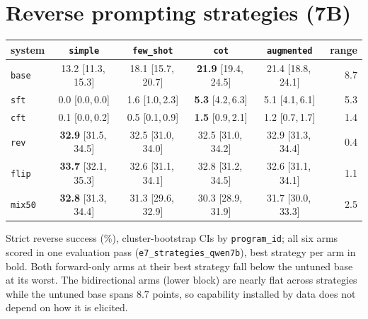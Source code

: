 \documentclass{article}
\newcommand{\arm}[1]{\texttt{#1}}
\newcommand{\ci}[2]{{\small[#1,\,#2]}}
\begin{document}
\section{Reverse prompting strategies (7B)}
\label{app:e7}
\begin{center}\small
\begin{tabular}{lccccr}
\toprule
system & \texttt{simple} & \texttt{few\_shot} & \texttt{cot} & \texttt{augmented} & range \\
\midrule
\arm{base} & 13.2 \ci{11.3}{15.3} & 18.1 \ci{15.7}{20.7} & \textbf{21.9} \ci{19.4}{24.5} & 21.4 \ci{18.8}{24.1} & 8.7 \\
\arm{sft} & 0.0 \ci{0.0}{0.0} & 1.6 \ci{1.0}{2.3} & \textbf{5.3} \ci{4.2}{6.3} & 5.1 \ci{4.1}{6.1} & 5.3 \\
\arm{cft} & 0.1 \ci{0.0}{0.2} & 0.5 \ci{0.1}{0.9} & \textbf{1.5} \ci{0.9}{2.1} & 1.2 \ci{0.7}{1.7} & 1.4 \\
\midrule
\arm{rev} & \textbf{32.9} \ci{31.5}{34.5} & 32.5 \ci{31.0}{34.0} & 32.5 \ci{31.0}{34.2} & 32.9 \ci{31.3}{34.4} & 0.4 \\
\arm{flip} & \textbf{33.7} \ci{32.1}{35.3} & 32.6 \ci{31.1}{34.1} & 32.8 \ci{31.2}{34.5} & 32.6 \ci{31.1}{34.1} & 1.1 \\
\arm{mix50} & \textbf{32.8} \ci{31.3}{34.4} & 31.3 \ci{29.6}{32.9} & 30.3 \ci{28.9}{31.9} & 31.7 \ci{30.0}{33.3} & 2.5 \\
\bottomrule
\end{tabular}
\end{center}
Strict reverse success (\%), cluster-bootstrap CIs by \texttt{program\_id}; all six arms
scored in one evaluation pass (\texttt{e7\_strategies\_qwen7b}), best strategy per arm in
bold. Both forward-only arms at their best strategy fall below the untuned base at its
worst. The bidirectional arms (lower block) are nearly flat across strategies while the
untuned base spans $8.7$ points, so capability installed by data does not depend on how it
is elicited.
\end{document}
